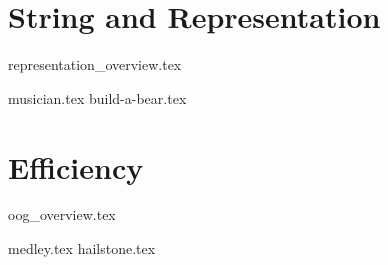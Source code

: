 \documentclass{exam}
\begin{document}
\section{String and Representation}
{representation_overview.tex}
\begin{questions}
    \newpage
    {musician.tex}
    \newpage
    {build-a-bear.tex}
\end{questions}

\section{Efficiency}
{oog_overview.tex}
\begin{questions}
    \newpage
    {medley.tex}
    \newpage
    {hailstone.tex}
\end{questions}
\end{document}
